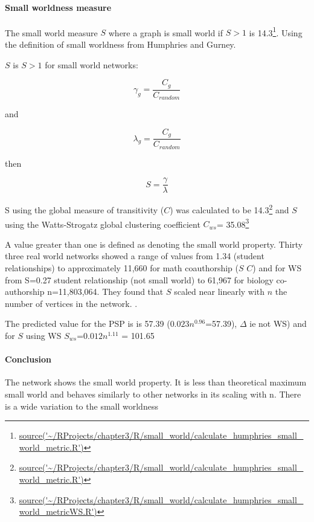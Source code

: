 \paragraph{Small worldness measure}
The small world measure $S$ where a graph is small world if $S>1$ \cite{humphries2008network} is 14.3\footnote{\url{source('~/RProjects/chapter3/R/small_world/calculate_humphries_small_world_metric.R')}}.
Using the definition of small worldness from Humphries and Gurney.

 $S$ is $S>1$ for small world networks:

\begin{equation}
    \gamma_g = \frac{C_g}{C_{random}}
\end{equation}

and

\begin{equation}
    \lambda_g = \frac{C_g}{C_{random}}
\end{equation}


then

\begin{equation}
    S = \frac{\gamma}{\lambda}
\end{equation}

S using the global measure of transitivity ($C$) was calculated to be 14.3\footnote{\url{source('~/RProjects/chapter3/R/small_world/calculate_humphries_small_world_metric.R')}} and $S$ using the Watts-Strogatz global clustering coefficient $C_{ws}$= 35.08\footnote{\url{source('~/RProjects/chapter3/R/small_world/calculate_humphries_small_world_metricWS.R')}}

A value greater than one is defined as denoting the small world property\cite{humphries2008network}. Thirty three real world networks showed a range of values from   1.34 (student relationships) to  approximately 11,660 for math coauthorship ($S$ $C$)  and for WS from S=0.27 student relationship (not small world) to 61,967 for biology co-authorship n=11,803,064. They found that $S$ scaled near linearly with $n$ the number of vertices in the network.  .

The predicted value for the PSP is is 57.39 ($0.023n^{0.96}$=57.39), $\Delta$ ie not WS) and for $S$ using WS $S_{ws}$=$0.012n^{1.11}$ = 101.65 



\paragraph{Conclusion} The network shows the small world property. It is less than theoretical maximum small world and behaves similarly to other networks in its scaling with n. There is a wide variation to the small worldness

